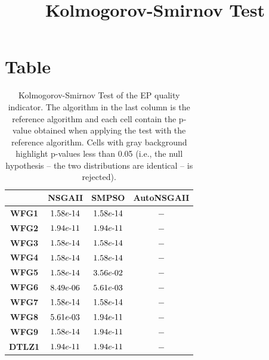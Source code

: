 \documentclass{article}
\title{Kolmogorov-Smirnov Test}
\author{}
\begin{document}
\maketitle
\section{Table}
\begin{table}[!htp]
  \caption{Kolmogorov-Smirnov Test of the EP quality indicator. The algorithm in the last column is the reference algorithm and each cell contain the p-value obtained when applying the test with the reference algorithm. Cells with gray background highlight p-values less than 0.05 (i.e., the null hypothesis -- the two distributions are identical -- is rejected).}
  \label{table:EP}
  \centering
  \begin{tiny}
  \begin{tabular}{c|ccc}
      & \textbf{NSGAII} & \textbf{SMPSO} & \textbf{AutoNSGAII} \\\hline
\textbf{WFG1} & $\cellcolor{gray25} 1.58e\makebox[0.1cm]{-}14 $ & $ \cellcolor{gray25} 1.58e\makebox[0.1cm]{-}14 $ & $ -$ \\
\textbf{WFG2} & $\cellcolor{gray25} 1.94e\makebox[0.1cm]{-}11 $ & $ \cellcolor{gray25} 1.94e\makebox[0.1cm]{-}11 $ & $ -$ \\
\textbf{WFG3} & $\cellcolor{gray25} 1.58e\makebox[0.1cm]{-}14 $ & $ \cellcolor{gray25} 1.58e\makebox[0.1cm]{-}14 $ & $ -$ \\
\textbf{WFG4} & $\cellcolor{gray25} 1.58e\makebox[0.1cm]{-}14 $ & $ \cellcolor{gray25} 1.58e\makebox[0.1cm]{-}14 $ & $ -$ \\
\textbf{WFG5} & $\cellcolor{gray25} 1.58e\makebox[0.1cm]{-}14 $ & $ \cellcolor{gray25} 3.56e\makebox[0.1cm]{-}02 $ & $ -$ \\
\textbf{WFG6} & $\cellcolor{gray25} 8.49e\makebox[0.1cm]{-}06 $ & $ \cellcolor{gray25} 5.61e\makebox[0.1cm]{-}03 $ & $ -$ \\
\textbf{WFG7} & $\cellcolor{gray25} 1.58e\makebox[0.1cm]{-}14 $ & $ \cellcolor{gray25} 1.58e\makebox[0.1cm]{-}14 $ & $ -$ \\
\textbf{WFG8} & $\cellcolor{gray25} 5.61e\makebox[0.1cm]{-}03 $ & $ \cellcolor{gray25} 1.94e\makebox[0.1cm]{-}11 $ & $ -$ \\
\textbf{WFG9} & $\cellcolor{gray25} 1.58e\makebox[0.1cm]{-}14 $ & $ \cellcolor{gray25} 1.94e\makebox[0.1cm]{-}11 $ & $ -$ \\
\textbf{DTLZ1} & $\cellcolor{gray25} 1.94e\makebox[0.1cm]{-}11 $ & $ \cellcolor{gray25} 1.94e\makebox[0.1cm]{-}11 $ & $ -$ \\

\end{tabular}
\end{tiny}
\end{table}
\end{document}
